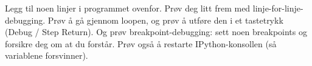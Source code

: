 %
%
Legg til noen linjer i programmet ovenfor. Prøv deg litt frem med linje-for-linje-debugging. Prøv å gå gjennom loopen, og prøv å utføre den i et tastetrykk (Debug / Step Return). Og prøv breakpoint-debugging: sett noen breakpoints og forsikre deg om at du forstår. Prøv også å restarte IPython-konsollen (så variablene forsvinner).
